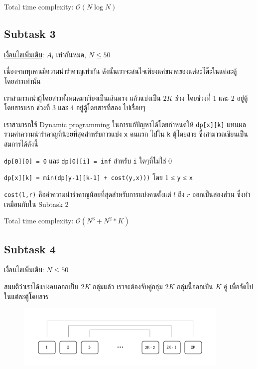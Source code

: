 \documentclass[12pt]{article}
\newcommand{\code}[1]{\texttt{\scriptsize{#1}}}
\begin{document}
Total time complexity: $\mathcal{O}(N \log N)$

\subsection{Subtask 3}

\underline{เงื่อนไขเพิ่มเติม}: $A_i$ เท่ากันหมด, $N \leq 50$

เนื่องจากทุกคนมีความน่ารำคาญเท่ากัน ดังนั้นเราจะสนใจเพียงแค่ขนาดของแต่ละโต๊ะในแต่ละตู้โดยสารเท่านั้น

เราสามารถนำผู้โดยสารทั้งหมดมาเรียงเป็นเส้นตรง แล้วแบ่งเป็น $2K$ ช่วง โดยช่วงที่ 1 และ 2 อยู่ตู้โดยสารแรก ช่วงที่ 3 และ 4 อยู่ตู้โดยสารที่สอง ไปเรื่อยๆ

เราสามารถใช้ Dynamic programming ในการแก้ปัญหาได้โดยกำหนดให้ \code{dp[x][k]} แทนผลรวมค่าความน่ารำคาญที่น้อยที่สุดสำหรับการแบ่ง \code{x} คนแรก ไปใน \code{k} ตู้โดยสาย ซึ่งสามารถเขียนเป็นสมการได้ดังนี้

\begin{center}
\code{dp[0][0] = 0} และ \code{dp[0][i] = inf} สำหรับ \code{i} ใดๆที่ไม่ใช่ 0

\code{dp[x][k] = min(dp[y-1][k-1] + cost(y,x)))} โดย 1 ≤ \code{y} ≤ \code{x}
\end{center}

\code{cost(l,r)} คือค่าความน่ารำคาญน้อยที่สุดสำหรับการแบ่งคนตั้งแต่ $l$ ถึง $r$ ออกเป็นสองส่วน ซึ่งทำเหมือนกับใน Subtask 2

Total time complexity: $\mathcal{O}(N^3 + N^2*K)$

\subsection{Subtask 4}

\underline{เงื่อนไขเพิ่มเติม}: $N \leq 50$

สมมติว่าเราได้แบ่งคนออกเป็น $2K$ กลุ่มแล้ว เราจะต้องจับคู่กลุ่ม $2K$ กลุ่มนี้ออกเป็น $K$ คู่ เพื่อจัดไปในแต่ละตู้โดยสาร


\begin{figure}[h]
  \centering
  \includegraphics[height=3cm]{./images/trainto.png}
\end{figure}
\end{document}
